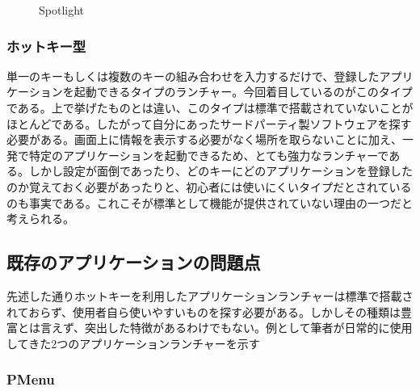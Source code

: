 \begin{figure}[h]
    \begin{center}
    \end{center}
    \caption{Spotlight}
    \label{fig:spotlight}
\end{figure}

\subsubsection{ホットキー型}

単一のキーもしくは複数のキーの組み合わせを入力するだけで、登録したアプリケーションを起動できるタイプのランチャー。今回着目しているのがこのタイプである。上で挙げたものとは違い、このタイプは標準で搭載されていないことがほとんどである。したがって自分にあったサードパーティ製ソフトウェアを探す必要がある。画面上に情報を表示する必要がなく場所を取らないことに加え、一発で特定のアプリケーションを起動できるため、とても強力なランチャーである。しかし設定が面倒であったり、どのキーにどのアプリケーションを登録したのか覚えておく必要があったりと、初心者には使いにくいタイプだとされているのも事実である。これこそが標準として機能が提供されていない理由の一つだと考えられる。

\subsection{既存のアプリケーションの問題点}

先述した通りホットキーを利用したアプリケーションランチャーは標準で搭載されておらず、使用者自ら使いやすいものを探す必要がある。しかしその種類は豊富とは言えず、突出した特徴があるわけでもない。例として筆者が日常的に使用してきた2つのアプリケーションランチャーを示す

\subsubsection{PMenu}

